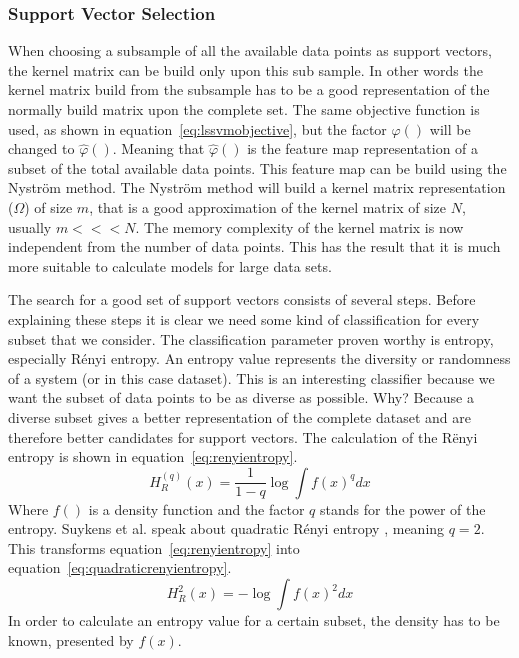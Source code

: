 \subsubsection{Support Vector Selection}
When choosing a subsample of all the available data points as support vectors, the kernel matrix can be build only upon this sub sample.
In other words the kernel matrix build from the subsample has to be a good representation of the normally build matrix upon the complete set. 
The same objective function is used, as shown in equation~\ref{eq:lssvmobjective}, but the factor $\varphi()$ will be changed to $\hat{\varphi}()$. 
Meaning that $\hat{\varphi}()$ is the feature map representation of a subset of the total available data points.
This feature map can be build using the Nystr\"{o}m method.
The Nystr\"{o}m method will build a kernel matrix representation ($\Omega$) of size $m$, that is a good approximation of the kernel matrix of size $N$, usually $m<<<N$.
The memory complexity of the kernel matrix is now independent from the number of data points.
This has the result that it is much more suitable to calculate models for large data sets.
\par
The search for a good set of support vectors consists of several steps.
Before explaining these steps it is clear we need some kind of classification for every subset that we consider.
The classification parameter proven worthy is entropy, especially R\'{e}nyi entropy.
An entropy value represents the diversity or randomness of a system (or in this case dataset).
This is an interesting classifier because we want the subset of data points to be as diverse as possible.
Why? Because a diverse subset gives a better representation of the complete dataset and are therefore better candidates for support vectors.
The calculation of the R\"{e}nyi entropy is shown in equation~\ref{eq:renyientropy}.
\begin{equation}
	H_R^{(q)}(x)=\frac{1}{1-q}\log\int f(x)^q dx
	\label{eq:renyientropy}
\end{equation}
Where $f()$ is a density function and the factor $q$ stands for the power of the entropy.
Suykens et al. speak about quadratic R\'{e}nyi entropy \cite{Suykens2002}, meaning $q=2$.
This transforms equation~\ref{eq:renyientropy} into equation~\ref{eq:quadraticrenyientropy}.
\begin{equation}
H_R^2(x)=-\log\int f(x)^2 dx
\label{eq:quadraticrenyientropy}
\end{equation}
In order to calculate an entropy value for a certain subset, the density has to be known, presented by $f(x)$.
